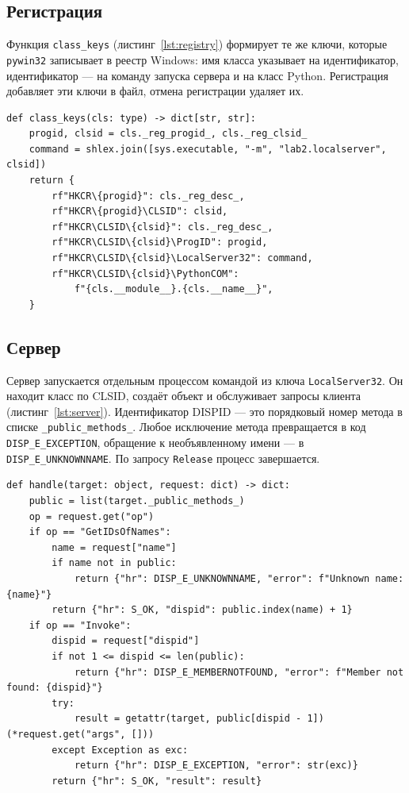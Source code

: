 \documentclass[14pt,a4paper]{extarticle}
\begin{document}
\subsection{Регистрация}

Функция \texttt{class\_keys} (листинг~\ref{lst:registry}) формирует те же ключи, которые
\texttt{pywin32} записывает в реестр Windows: имя класса указывает на идентификатор,
идентификатор --- на команду запуска сервера и на класс Python. Регистрация добавляет
эти ключи в файл, отмена регистрации удаляет их.

\begin{lstlisting}[style=python, caption={Ключи, создаваемые при регистрации}, label={lst:registry}]
def class_keys(cls: type) -> dict[str, str]:
    progid, clsid = cls._reg_progid_, cls._reg_clsid_
    command = shlex.join([sys.executable, "-m", "lab2.localserver", clsid])
    return {
        rf"HKCR\{progid}": cls._reg_desc_,
        rf"HKCR\{progid}\CLSID": clsid,
        rf"HKCR\CLSID\{clsid}": cls._reg_desc_,
        rf"HKCR\CLSID\{clsid}\ProgID": progid,
        rf"HKCR\CLSID\{clsid}\LocalServer32": command,
        rf"HKCR\CLSID\{clsid}\PythonCOM":
            f"{cls.__module__}.{cls.__name__}",
    }
\end{lstlisting}

\subsection{Сервер}

Сервер запускается отдельным процессом командой из ключа \texttt{LocalServer32}. Он
находит класс по CLSID, создаёт объект и обслуживает запросы клиента
(листинг~\ref{lst:server}). Идентификатор DISPID --- это порядковый номер метода в
списке \texttt{\_public\_methods\_}. Любое исключение метода превращается в код
\texttt{DISP\_E\_EXCEPTION}, обращение к необъявленному имени --- в
\texttt{DISP\_E\_UNKNOWNNAME}. По запросу \texttt{Release} процесс завершается.

\begin{lstlisting}[style=python, caption={Обработка запросов в процессе сервера}, label={lst:server}]
def handle(target: object, request: dict) -> dict:
    public = list(target._public_methods_)
    op = request.get("op")
    if op == "GetIDsOfNames":
        name = request["name"]
        if name not in public:
            return {"hr": DISP_E_UNKNOWNNAME, "error": f"Unknown name: {name}"}
        return {"hr": S_OK, "dispid": public.index(name) + 1}
    if op == "Invoke":
        dispid = request["dispid"]
        if not 1 <= dispid <= len(public):
            return {"hr": DISP_E_MEMBERNOTFOUND, "error": f"Member not found: {dispid}"}
        try:
            result = getattr(target, public[dispid - 1])(*request.get("args", []))
        except Exception as exc:
            return {"hr": DISP_E_EXCEPTION, "error": str(exc)}
        return {"hr": S_OK, "result": result}
\end{lstlisting}
\end{document}
